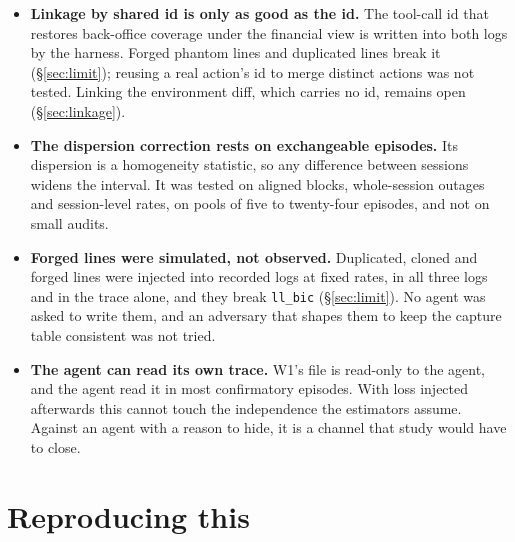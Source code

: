 \documentclass[11pt]{article}
\begin{document}
\begin{itemize}
counter covered 0.0 (\S\ref{sec:bypass}). Canaries were not run with bypass.
\item \textbf{Linkage by shared id is only as good as the id.} The tool-call
id that restores back-office coverage under the financial view is written into
both logs by the harness. Forged phantom lines and duplicated lines break it
(\S\ref{sec:limit}); reusing a real action's id to merge distinct actions was not
tested. Linking the environment diff, which carries no id, remains open
(\S\ref{sec:linkage}).
\item \textbf{The dispersion correction rests on exchangeable episodes.} Its
dispersion is a homogeneity statistic, so any difference between sessions widens
the interval. It was tested on aligned blocks, whole-session outages and
session-level rates, on pools of five to twenty-four episodes, and not on small
audits.
\item \textbf{Forged lines were simulated, not observed.} Duplicated, cloned and
forged lines were injected into recorded logs at fixed rates, in all three logs and
in the trace alone, and they break \texttt{ll\_bic} (\S\ref{sec:limit}). No agent
was asked to write them, and an adversary that shapes them to keep the capture
table consistent was not tried.
\item \textbf{The agent can read its own trace.} W1's file is read-only to the
agent, and the agent read it in most confirmatory episodes. With loss injected
afterwards this cannot touch the independence the estimators assume. Against an
agent with a reason to hide, it is a channel that study would have to close.
\end{itemize}

\section{Reproducing this}
\label{sec:reproduce}
\end{document}
